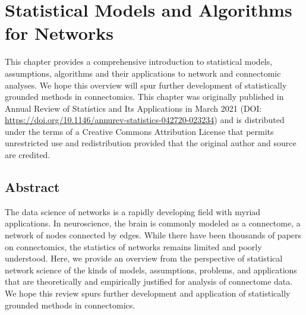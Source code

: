\chapter{Statistical Models and Algorithms for Networks} \label{chap:statistical}

This chapter provides a comprehensive introduction to statistical models, assumptions, algorithms and their applications to network and connectomic analyses. We hope this overview will spur further development of statistically grounded methods in connectomics. This chapter was originally published in Annual Review of Statistics and Its Applications in March 2021 (DOI: \url{https://doi.org/10.1146/annurev-statistics-042720-023234}) and is distributed under the terms of a Creative Commons Attribution License that permits unrestricted use and redistribution provided that the original author and source are credited.

\begin{singlespace}         %
\end{singlespace} 

\pagebreak
\section*{Abstract}
The data science of networks is a rapidly developing field with myriad applications.  In neuroscience, the brain is commonly modeled as a connectome, a network of nodes connected by edges. While there have been thousands of papers on connectomics, the statistics of networks remains limited and poorly understood.  Here, we provide an overview from the perspective of statistical network science of the kinds of models, assumptions, problems, and applications that are theoretically and empirically justified for analysis of connectome data.  We hope this review spurs further development and application of statistically grounded methods in connectomics.
\pagebreak










